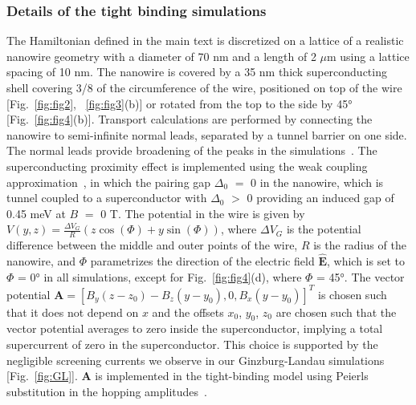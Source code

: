 \subsubsection{Details of the tight binding simulations}
The Hamiltonian defined in the main text is discretized on a lattice of a realistic nanowire geometry with a diameter of 70 nm and a length of 2 $\mu$m using a lattice spacing of 10 nm.
The nanowire is covered by a 35 nm thick superconducting shell covering 3/8 of the circumference of the wire, positioned on top of the wire [Fig.~\ref{fig:fig2}, ~\ref{fig:fig3}(b)] or rotated from the top to the side by \ang{45} [Fig.~\ref{fig:fig4}(b)].
Transport calculations are performed by connecting the nanowire to semi-infinite normal leads, separated by a tunnel barrier on one side.
The normal leads provide broadening of the peaks in the simulations~\cite{Liu2017a,Danon2017}.
The superconducting proximity effect is implemented using the weak coupling approximation~\cite{Nijholt2016}, in which the pairing gap $\Delta_0$ $=$ 0 in the nanowire, which is tunnel coupled to a superconductor with $\Delta_0$ $>$ 0 providing an induced gap of 0.45 meV at $B$ $=$ 0 T.
The potential in the wire is given by $V(y,z)= \frac{\Delta V_G}{R} (z\cos(\Phi)+y\sin(\Phi))$, where $\Delta V_G$ is the potential difference between the middle and outer points of the wire, $R$ is the radius of the nanowire, and $\Phi$ parametrizes the direction of the electric field $\mathbf{\hat{E}}$, which is set to $\Phi$ = \ang{0} in all simulations, except for Fig.~\ref{fig:fig4}(d), where $\Phi$ = \ang{45}.
The vector potential $\mathbf{A} = \left[B_y(z-z_0)-B_z(y-y_0),0,B_x(y-y_0)\right]^T$ is chosen such that it does not depend on $x$ and the offsets $x_0$, $y_0$, $z_0$ are chosen such that the vector potential averages to zero inside the superconductor, implying a total supercurrent of zero in the superconductor.
This choice is supported by the negligible screening currents we observe in our Ginzburg-Landau simulations [Fig.~\ref{fig:GL}].
$\mathbf{A}$ is implemented in the tight-binding model using Peierls substitution in the hopping amplitudes~\cite{Hofstadter1976}.

